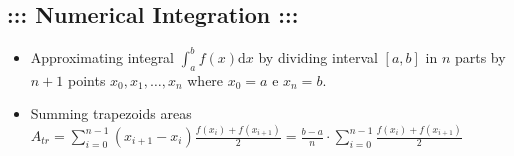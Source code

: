 \documentclass[a4paper,12pt]{amsart}
\newif\ifita
\begin{document}
\subsection*{\bf ::: \ifita Integrazione Numerica \else Numerical Integration \fi :::} 
\begin{itemize}
\item \ifita Approssimo l'integrale \else Approximating integral \fi $\int_{a}^b f(x) \mathrm{d}x$ \ifita dividendo l'intervallo \else by dividing interval \fi $[a,b]$ in $n$ \ifita parti mediante gli \else parts by \fi $n+1$ \ifita punti \else points \fi $x_0,x_1,\ldots,x_n$ \ifita con \else where \fi $x_0=a$ e $x_n=b$.
\item \ifita Somma aree trapezi \else Summing trapezoids areas \fi $A_{tr}=\sum_{i=0}^{n-1} (x_{i+1}-x_i) \frac{f(x_i)+f(x_{i+1})}{2}=\frac{b-a}{n} \cdot \sum_{i=0}^{n-1} \frac{f(x_i)+f(x_{i+1})}{2}$
\end{itemize}
\end{document}
